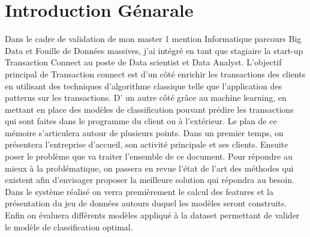 \chapter*{Introduction Génarale}

Dans le cadre de validation de mon master 1 mention Informatique parcours Big Data et Fouille de Données massives, j’ai intégré en tant que stagiaire la start-up Transaction Connect au poste de Data scientist et Data Analyst. 
\newline
L’objectif principal de Transaction connect est d’un côté enrichir les transactions des clients en utilisant des techniques d’algorithme classique telle que l’application des patterns sur les transactions. D' un autre côté grâce au machine learning, en mettant en place des modèles de classification pouvant prédire les transactions qui sont faites dans le programme du client ou à l’extérieur. 
\newline
Le plan de ce mémoire s’articulera autour de plusieurs points. Dans un premier temps, on présentera l’entreprise d'accueil, son activité principale et ses clients. Ensuite poser le problème que va traiter l'ensemble de ce document. Pour répondre au mieux à la problématique, on passera en revue l’état de l’art des méthodes qui existent afin d’envisager proposer la meilleure solution qui répondra au besoin. Dans le système réalisé on verra premièrement le calcul des features et la présentation du jeu de données autours duquel les modèles seront construits. Enfin on évaluera différents modèles appliqué à la dataset permettant de valider le modèle de classification optimal.
